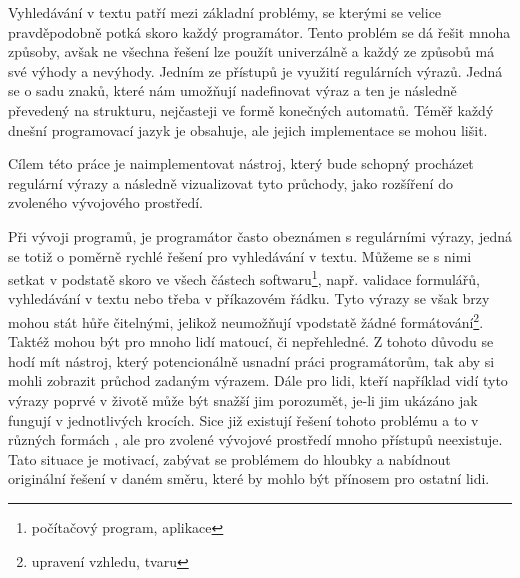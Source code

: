 Vyhledávání v textu patří mezi základní problémy, se kterými se velice pravděpodobně potká skoro každý programátor. 
Tento problém se dá řešit mnoha způsoby, avšak ne všechna řešení lze použít univerzálně a každý ze způsobů má své výhody a nevýhody.
Jedním ze přístupů je využití regulárních výrazů. Jedná se o sadu znaků, které nám umožňují nadefinovat výraz a ten je následně převedený na strukturu, nejčasteji ve formě konečných automatů.
Téměř každý dnešní programovací jazyk je obsahuje, ale jejich implementace se mohou lišit.

Cílem této práce je naimplementovat nástroj, který bude schopný procházet regulární výrazy a následně vizualizovat tyto průchody, jako rozšíření do zvoleného vývojového prostředí.

Při vývoji programů, je programátor často obeznámen s regulárními výrazy, jedná se totiž o poměrně rychlé řešení pro vyhledávání v textu. 
Můžeme se s nimi setkat v podstatě skoro ve všech částech softwaru\footnote{počítačový program, aplikace}, např. validace formulářů, vyhledávání v textu nebo třeba v příkazovém řádku.
Tyto výrazy se však brzy mohou stát hůře čitelnými, jelikož neumožňují vpodstatě žádné formátování\footnote{upravení vzhledu, tvaru}. 
Taktéž mohou být pro mnoho lidí matoucí, či nepřehledné.
Z tohoto důvodu se hodí mít nástroj, který potencionálně usnadní práci programátorům, tak aby si mohli zobrazit průchod zadaným výrazem.
Dále pro lidi, kteří například vidí tyto výrazy poprvé v životě může být snažší jim porozumět, je-li jim ukázáno jak fungují v jednotlivých krocích.
Sice již existují řešení tohoto problému a to v různých formách \cite{Dib, Regexper, RegExr}, ale pro zvolené vývojové prostředí mnoho přístupů neexistuje.
Tato situace je motivací, zabývat se problémem do hloubky a nabídnout originální řešení v daném směru, které by mohlo být přínosem pro ostatní lidi.

